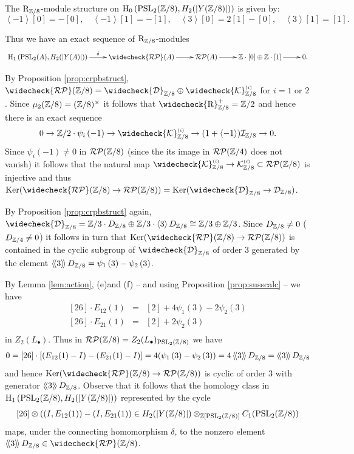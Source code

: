 \documentclass[12pt]{amsart}
\theoremstyle{definition}
\newcommand{\Z}{\Bbb{Z}}
\newcommand{\K}{\mathcal{K}}
\newcommand{\octt}[1]{\left[ #1\right]}%
\newcommand{\pspl}[2]{\mathrm{PSL}_{#1}(#2)}
\newcommand{\rpb}[1]{\mathcal{RP}(#1)}%
\newcommand{\crpb}[1]{\widecheck{\mathcal{RP}}(#1)}
\newcommand{\suss}[2]{\psi_{#1}\left( #2\right)}
\newcommand{\ks}[2]{{\K}^{\mbox{\tiny $(#1)$}}_{#2}}
\newcommand{\cks}[2]{\widecheck{{\K}}^{\mbox{\tiny $(#1)$}}_{#2}}
\newcommand{\cconst}[1]{D_{#1}}
\newcommand{\cconstmod}[1]{\mathcal{D}_{#1}}
\newcommand{\ccconstmod}[1]{\widecheck{\mathcal{D}}_{#1}}
\newcommand{\<}{\langle}
\renewcommand{\>}{\rangle}
\renewcommand{\ker}[1]{\mathrm{Ker}(#1)}
\newcommand{\sgr}[1]{\mathrm{R}_{#1}}%
\newcommand{\tsgr}[1]{\widecheck{\mathrm{R}}^{+}_{#1}} %
\newcommand{\an}[1]{\left\langle{#1}\right\rangle}
\newcommand{\pf}[1]{\left\langle\!\left\langle{#1}\right\rangle\!\right\rangle}
\newcommand{\aug}[1]{\mathcal{I}_{#1}}
\newcommand{\ho}[3]{\mathrm{H}_{#1}\left( #2,#3 \right)}
\begin{document}
The $\sgr{\Z/8}$-module structure on  $\ho{0}{\pspl{2}{\Z/8}}{H_2(|Y(\Z/8)|)}$  is given by:
\[
\an{-1}\octt{0}=-\octt{0},\quad \an{-1}\octt{1}=-\octt{1},\quad \an{3}\octt{0}=2\octt{1}-\octt{0},\quad \an{3}\octt{1}=\octt{1}.
\]

Thus we have an exact sequence of $\sgr{\Z/8}$-modules
\[
\xymatrix{
\ho{1}{\pspl{2}{A}}{H_2(|Y(A)|)}\ar^-{\delta}[r]&\crpb{A}\ar[r]&\rpb{A}\ar[r]&\Z\cdot\octt{0}\oplus\Z\cdot\octt{1}\ar[r]&0.\\
}
\]

By Proposition \ref{prop:crpbstruct}, $\crpb{\Z/8}=\ccconstmod{\Z/8}\oplus \cks{i}{\Z/8}$ for $i=1$ or $2$. Since $\mu_2(\Z/8)=(\Z/8)^\times$ it follows that $\tsgr{\Z/8}=\Z/2$ and hence there is an exact sequence 
\[
0\to \Z/2\cdot \suss{i}{-1}\to\cks{i}{\Z/8}\to (1+\an{-1})\aug{\Z/8}\to 0.
\]
Since $\suss{i}{-1}\not=0$ in $\rpb{\Z/8}$ (since the its image in $\rpb{\Z/4}$ does not vanish) it follows that the natural map $\cks{i}{\Z/8}\to\ks{i}{\Z/8}\subset\rpb{\Z/8}$ is injective and thus $\ker{\crpb{\Z/8}\to\rpb{\Z/8}}=\ker{\ccconstmod{\Z/8}\to\cconstmod{\Z/8}}$. 

By Proposition \ref{prop:crpbstruct} again, $\ccconstmod{\Z/8}=\Z/3\cdot\cconst{\Z/8}\oplus \Z/3\cdot\an{3}\cconst{\Z/8}\cong \Z/3\oplus\Z/3$. Since $\cconst{\Z/8}\not=0$ ($\cconst{\Z/4}\not=0$) it follows in turn that $\ker{\crpb{\Z/8}\to\rpb{\Z/8}}$ is contained in the cyclic subgroup of $\ccconstmod{\Z/8}$ of order $3$ generated by the element
$\pf{3}\cconst{\Z/8}=\suss{1}{3}-\suss{2}{3}$.



By Lemma \ref{lem:action}, (e)and (f) -- and using Proposition \ref{prop:susscalc} -- we have
\begin{eqnarray*}
\octt{26}\cdot E_{12}(1)&=& \octt{2}+4\suss{1}{3}-2\suss{2}{3}\\
\octt{26}\cdot E_{21}(1)&=& \octt{2}+2\suss{2}{3}\\
\end{eqnarray*}
in $Z_2(L_\bullet)$. Thus in $\rpb{\Z/8}=Z_2(L_\bullet)_{\pspl{2}{\Z/8}}$ we have 
\begin{eqnarray*}
0=\octt{26}\cdot\left[ (E_{12}(1)-I)-(E_{21}(1)-I)\right] =4(\suss{1}{3}-\suss{2}{3})=4\pf{3}\cconst{\Z/8}=\pf{3}\cconst{\Z/8}
\end{eqnarray*}
and hence $\ker{\crpb{\Z/8}\to\rpb{\Z/8}}$ is cyclic of order $3$ with generator $\pf{3}\cconst{\Z/8}$. Observe that it follows that the homology class in $\ho{1}{\pspl{2}{\Z/8}}{H_2(|Y(\Z/8)|)}$ represented by the cycle 
\[
\octt{26}\otimes \left((I,E_{12}(1))-(I,E_{21}(1)\right)\in H_2(|Y(\Z/8)|)\otimes_{\Z[\pspl{2}{\Z/8}]}C_1(\pspl{2}{\Z/8})
\]
maps, under the connecting homomorphism $\delta$,  to the nonzero element $\pf{3}\cconst{\Z/8}\in \crpb{\Z/8}$.
\end{document}

